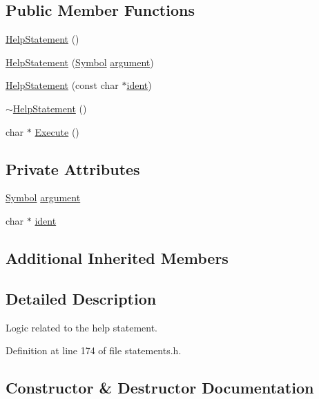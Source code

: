 \subsection*{Public Member Functions}
\begin{DoxyCompactItemize}
\item 
\hyperlink{classHelpStatement_aed16b9cc1ef9e4d7bf4909d66e4012c0}{Help\+Statement} ()
\item 
\hyperlink{classHelpStatement_a09929d994355a84bebd655be6d463bfb}{Help\+Statement} (\hyperlink{lex_8h_a7feef761cd73fac6e25b8bb80d2c4e54}{Symbol} \hyperlink{classHelpStatement_abef33224fd4d73c2501217dba61dd395}{argument})
\item 
\hyperlink{classHelpStatement_a638be9d0c5c09a437c75f07ba8229cbe}{Help\+Statement} (const char $\ast$\hyperlink{classHelpStatement_a464f49dcbd47d1050df5b822aaffc839}{ident})
\item 
\hyperlink{classHelpStatement_adbab00ec8eacb88cbb252740849d82f1}{$\sim$\+Help\+Statement} ()
\item 
char $\ast$ \hyperlink{classHelpStatement_a733d3471c3bcfdd2d07d4766bbdbf6db}{Execute} ()
\end{DoxyCompactItemize}
\subsection*{Private Attributes}
\begin{DoxyCompactItemize}
\item 
\hyperlink{lex_8h_a7feef761cd73fac6e25b8bb80d2c4e54}{Symbol} \hyperlink{classHelpStatement_abef33224fd4d73c2501217dba61dd395}{argument}
\item 
char $\ast$ \hyperlink{classHelpStatement_a464f49dcbd47d1050df5b822aaffc839}{ident}
\end{DoxyCompactItemize}
\subsection*{Additional Inherited Members}


\subsection{Detailed Description}
Logic related to the help statement. 

Definition at line 174 of file statements.\+h.



\subsection{Constructor \& Destructor Documentation}
